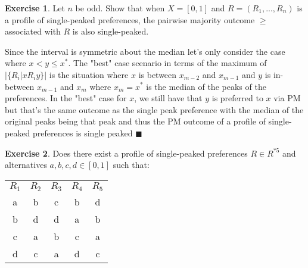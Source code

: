 \documentclass[11pt,oneside]{article}
\numberwithin{equation}{section}
\theoremstyle{definition}
\newtheorem{exercise}{Exercise}
\newcommand{\QED}{\blacksquare}
\begin{document}
\begin{exercise}

Let $n$ be odd. Show that when $X = [0, 1]$ and $R = (R_1, . . . , R_n)$ is a profile of single-peaked preferences, the pairwise majority outcome $\geq$ associated with $R$ is also single-peaked.


\end{exercise}

\begin{solution}

Since the interval is symmetric about the median let's only consider the case where $x < y \leq x^*$. The "best" case scenario in terms of the maximum of $|\{R_i | x R_i y\}|$ is the situation where $x$ is between $x_{m-2}$ and $x_{m-1}$ and $y$ is in-between $x_{m-1}$ and $x_m$ where $x_m = x^*$ is the median of the peaks of the preferences. In the "best" case for $x$, we still have that $y$ is preferred to $x$ via PM but that's the same outcome as the single peak preference with the median of the original peaks being that peak and thus the PM outcome of a profile of single-peaked preferences is single peaked $\QED$



\end{solution}

\begin{exercise}
Does there exist a profile of single-peaked preferences $R \in R^{*5}$ and alternatives $a, b, c, d \in [0, 1]$ such that:

\begin{center}
\begin{tabular}{ c c c c c}
$R_1$ & $R_2$ & $R_3$ & $R_4$ & $R_5$ \\
a & b & c & b & d \\
b & d & d & a & b \\
c & a & b & c & a \\
d & c & a & d &c
\end{tabular}
\end{center}

\end{exercise}
\end{document}
